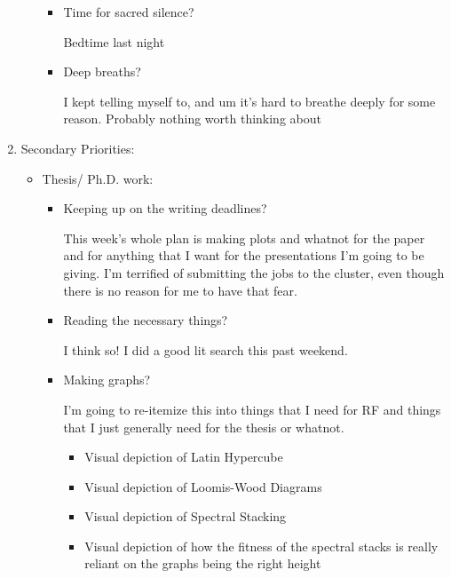 \documentclass[12pt]{article}
\renewcommand{\,}{\textsuperscript{,}}
\begin{document}
\begin{enumerate}
\begin{itemize}
\begin{itemize}
\item Time for sacred silence?

Bedtime last night

\item Deep breaths?

I kept telling myself to, and um it's hard to breathe deeply for some reason. Probably nothing worth thinking about

\end{itemize}

\end{itemize}

\item Secondary Priorities:

\begin{itemize}

\item Thesis/ Ph.D. work:

\begin{itemize}

\item Keeping up on the writing deadlines?

This week's whole plan is making plots and whatnot for the paper and for anything that I want for the presentations I'm going to be giving.  
I'm terrified of submitting the jobs to the cluster, even though there is no reason for me to have that fear.

\item Reading the necessary things?

I think so! I did a good lit search this past weekend.

\item Making graphs?

I'm going to re-itemize this into things that I need for RF and things that I just generally need for the thesis or whatnot.

\begin{itemize}

\item Visual depiction of Latin Hypercube

\item Visual depiction of Loomis-Wood Diagrams

\item Visual depiction of Spectral Stacking

\item Visual depiction of how the fitness of the spectral stacks is really reliant on the graphs being the right height


\end{itemize}
\end{itemize}
\end{itemize}
\end{enumerate}
\end{document}
